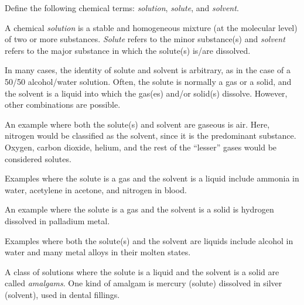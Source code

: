 

Define the following chemical terms: {\it solution}, {\it solute}, and {\it solvent}.







A chemical {\it solution} is a stable and homogeneous mixture (at the molecular level) of two or more substances.  {\it Solute} refers to the minor substance(s) and {\it solvent} refers to the major substance in which the solute(s) is/are dissolved.

\vskip 10pt

In many cases, the identity of solute and solvent is arbitrary, as in the case of a 50/50 alcohol/water solution.  Often, the solute is normally a gas or a solid, and the solvent is a liquid into which the gas(es) and/or solid(s) dissolve.  However, other combinations are possible.

\vskip 10pt

An example where both the solute(s) and solvent are gaseous is air.  Here, nitrogen would be classified as the solvent, since it is the predominant substance.  Oxygen, carbon dioxide, helium, and the rest of the ``lesser'' gases would be considered solutes.

\vskip 10pt

Examples where the solute is a gas and the solvent is a liquid include ammonia in water, acetylene in acetone, and nitrogen in blood.

\vskip 10pt

An example where the solute is a gas and the solvent is a solid is hydrogen dissolved in palladium metal.

\vskip 10pt

Examples where both the solute(s) and the solvent are liquids include alcohol in water and many metal alloys in their molten states.

\vskip 10pt

A class of solutions where the solute is a liquid and the solvent is a solid are called {\it amalgams}.  One kind of amalgam is mercury (solute) dissolved in silver (solvent), used in dental fillings.

\vskip 10pt

